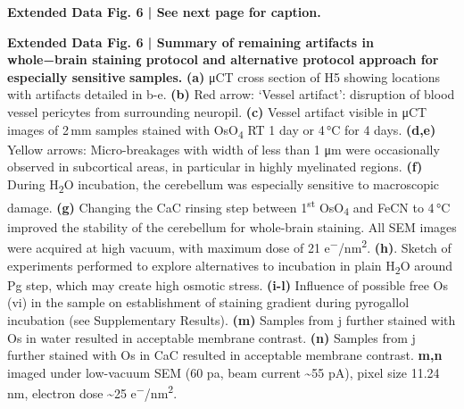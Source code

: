 \documentclass{article}
\begin{document}
\textbf{Extended Data Fig. 6 | See next page for caption.}

\textbf{Extended Data Fig. 6 | Summary of remaining artifacts in whole−brain staining protocol and alternative protocol approach for especially sensitive } \textbf{samples.} \textbf{(a)} μCT cross section of H5 showing locations with artifacts detailed in b-e. \textbf{(b)} Red arrow: ‘Vessel artifact’: disruption of blood vessel pericytes from surrounding neuropil. \textbf{(c)} Vessel artifact visible in μCT images of 2\,mm samples stained with OsO\textsubscript{4} RT 1 day or 4\,°C for 4 days. \textbf{(d,e)} Yellow arrows: Micro-breakages with width of less than 1 μm were occasionally observed in subcortical areas, in particular in highly myelinated regions. \textbf{(f)} During H\textsubscript{2}O incubation, the cerebellum was especially sensitive to macroscopic damage. \textbf{(g)} Changing the CaC rinsing step between 1\textsuperscript{st} OsO\textsubscript{4} and FeCN to 4\,°C improved the stability of the cerebellum for whole-brain staining. All SEM images were acquired at high vacuum, with maximum dose of 21 e\textsuperscript{−}/nm\textsuperscript{2}. \textbf{(h)}. Sketch of experiments performed to explore alternatives to incubation in plain H\textsubscript{2}O around Pg step, which may create high osmotic stress. \textbf{(i-l)} Influence of possible free Os (vi) in the sample on establishment of staining gradient during pyrogallol incubation (see Supplementary Results). \textbf{(m)} Samples from j further stained with Os in water resulted in acceptable membrane contrast. \textbf{(n)} Samples from j further stained with Os in CaC resulted in acceptable membrane contrast. \textbf{m,n} imaged under low-vacuum SEM (60 pa, beam current \textasciitilde{}55 pA), pixel size 11.24\,nm, electron dose \textasciitilde{}25 e\textsuperscript{−}/nm\textsuperscript{2}.
\end{document}
